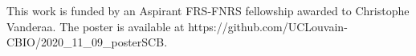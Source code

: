 \documentclass{article}
\begin{document}
\begin{multicols}{2}
\begin{minipage}[t]{\linewidth}
\end{minipage}

\scriptsize
 


\noindent
This work is funded by an Aspirant FRS-FNRS fellowship awarded to 
Christophe Vanderaa.   The poster is available at {\color{blue}
{https://github.com/UCLouvain-CBIO/2020\_11\_09\_posterSCB}}.

\end{multicols}
\end{document}
